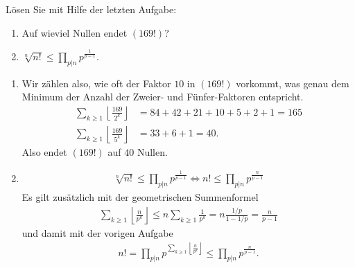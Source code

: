 
\begin{exercise}

Lösen Sie mit Hilfe der letzten Aufgabe:
\begin{enumerate}[label = (\alph*)]
  \item Auf wieviel Nullen endet $(169!)$?
  \item $\sqrt[n]{n!} \leq \prod_{p|n}p^{\frac{1}{p-1}}$.
\end{enumerate}

\end{exercise}


\begin{solution}

\phantom{}

\begin{enumerate}[label = (\alph*)]
  \item Wir zählen also, wie oft der Faktor $10$ in $(169!)$ vorkommt,
  was genau dem Minimum der Anzahl der Zweier- und Fünfer-Faktoren entspricht.
  \begin{align*}
    \sum_{k \geq 1} \left\lfloor \frac{169}{2^k}\right\rfloor
    &= 84 + 42 + 21 + 10 + 5 + 2 + 1 = 165 \\
    \sum_{k \geq 1} \left\lfloor \frac{169}{5^k}\right\rfloor
    &= 33 + 6 + 1 = 40.
  \end{align*}
  Also endet $(169!)$ auf $40$ Nullen.
  \item
  \begin{align*}
    \sqrt[n]{n!} \leq \prod_{p|n}p^{\frac{1}{p-1}}
    \iff n! \leq \prod_{p|n}p^{\frac{n}{p-1}}
  \end{align*}
  Es gilt zusätzlich mit der geometrischen Summenformel
  \begin{align*}
    \sum_{k \geq 1} \left\lfloor \frac{n}{p^k}\right\rfloor
    \leq n\sum_{k \geq 1} \frac{1}{p^k}
    = n\frac{1/p}{1 - 1/p} = \frac{n}{p - 1}
  \end{align*}
  und damit mit der vorigen Aufgabe
  \begin{align*}
    n! = \prod_{p|n}p^{\sum_{k \geq 1} \left\lfloor \frac{n}{p^k}\right\rfloor}
    \leq \prod_{p|n}p^{\frac{n}{p - 1}}.
  \end{align*}
\end{enumerate}

\end{solution}

